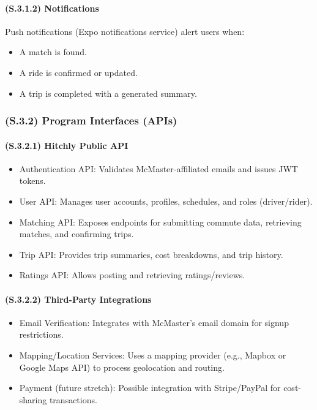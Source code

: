 \documentclass[12pt,letterpaper]{article}
\begin{document}
\paragraph{(S.3.1.2) Notifications} %
Push notifications (Expo notifications service) alert users when:

\begin{itemize}
    \item A match is found.
    \item A ride is confirmed or updated.
    \item A trip is completed with a generated summary.
\end{itemize}

\subsubsection{(S.3.2) Program Interfaces (APIs)} %

\paragraph{(S.3.2.1) Hitchly Public API} %
\begin{itemize}
    \item Authentication API: Validates McMaster-affiliated emails and issues JWT tokens.
    \item User API: Manages user accounts, profiles, schedules, and roles (driver/rider).
    \item Matching API: Exposes endpoints for submitting commute data, retrieving matches, and confirming trips.
    \item Trip API: Provides trip summaries, cost breakdowns, and trip history.
    \item Ratings API: Allows posting and retrieving ratings/reviews.
\end{itemize}

\paragraph{(S.3.2.2) Third-Party Integrations} %
\begin{itemize}
    \item Email Verification: Integrates with McMaster’s email domain for signup restrictions.
    \item Mapping/Location Services: Uses a mapping provider (e.g., Mapbox or Google Maps API) to process geolocation and routing.
    \item Payment (future stretch): Possible integration with Stripe/PayPal for cost-sharing transactions.
\end{itemize}
\end{document}
